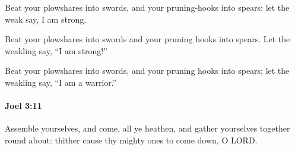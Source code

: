 			\begin{versebox}
					\item[BHS] 
					\item[LXX] 
					\item[ASV] Beat your plowshares into swords, and your pruning-hooks into spears: let the weak say, I am strong.
					\item[NIV] Beat your plowshares into swords and your pruning hooks into spears. Let the weakling say, “I am strong!”
					\item[NRSV] Beat your plowshares into swords, and your pruning hooks into spears; let the weakling say, “I am a warrior.”
			\end{versebox}

		\paragraph{Joel 3:11} %
			\label{JOEL-3-11}

			Assemble yourselves, and come, all ye heathen, and gather yourselves together round about: thither cause thy mighty ones to come down, O LORD.

